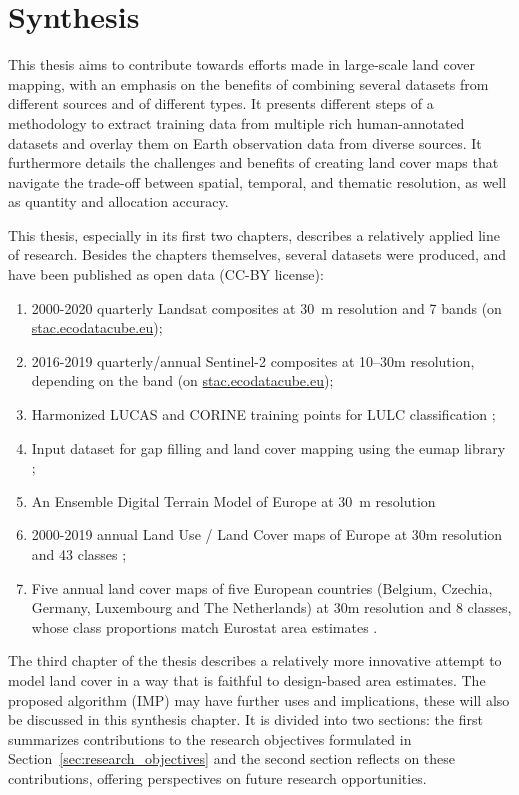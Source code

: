 \chapter[Synthesis]{Synthesis}
\label{cha:Chapter6}
\newpage

This thesis aims to contribute towards efforts made in large-scale land cover mapping, with an emphasis on the benefits of combining several datasets from different sources and of different types. It presents different steps of a methodology to extract training data from multiple rich human-annotated datasets and overlay them on Earth observation data from diverse sources. It furthermore details the challenges and benefits of creating land cover maps that navigate the trade-off between spatial, temporal, and thematic resolution, as well as quantity and allocation accuracy.

This thesis, especially in its first two chapters, describes a relatively applied line of research. Besides the chapters themselves, several datasets were produced, and have been published as open data (CC-BY license):
\begin{enumerate}
    \item 2000-2020 quarterly Landsat composites at 30~m resolution and 7 bands (on \url{stac.ecodatacube.eu});
    \item 2016-2019 quarterly/annual Sentinel-2 composites at 10--30m resolution, depending on the band (on \url{stac.ecodatacube.eu});
    \item Harmonized LUCAS and CORINE training points for LULC classification \citep{landa2021multi};
    \item Input dataset for gap filling and land cover mapping using the eumap library \citep{parente2020input};
    \item An Ensemble Digital Terrain Model of Europe at 30~m resolution \citep{hengl2021continental}
    \item 2000-2019 annual Land Use / Land Cover maps of Europe at 30m resolution and 43 classes \citep{parente2021continental};
    \item Five annual land cover maps of five European countries (Belgium, Czechia, Germany, Luxembourg and The Netherlands) at 30m resolution and 8 classes, whose class proportions match Eurostat area estimates \citep{witjes2024iterative_data}.
\end{enumerate}
The third chapter of the thesis describes a relatively more innovative attempt to model land cover in a way that is faithful to design-based area estimates. The proposed algorithm (IMP) may have further uses and implications, these will also be discussed in this synthesis chapter. It is divided into two sections: the first summarizes contributions to the research objectives formulated in Section~\ref{sec:research_objectives} and the second section reflects on these contributions, offering perspectives on future research opportunities. 

